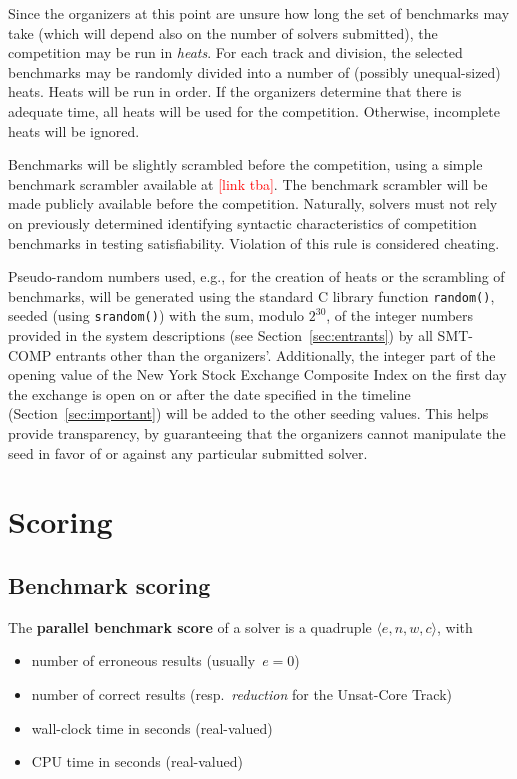 \documentclass[12pt]{article}
\newcommand{\rem}[1]{\textcolor{red}{[#1]}}
\newcommand{\ucoretrack}{Unsat-Core Track\xspace}
\begin{document}
%
Since the organizers at this point are unsure how long the set of
benchmarks may take (which will depend also on the number of solvers
submitted), the competition may be run in \emph{heats}.  For each
track and division, the selected benchmarks may be randomly divided
into a number of (possibly unequal-sized) heats.  Heats will be run in
order.  If the organizers determine that there is adequate time, all
heats will be used for the competition.  Otherwise, incomplete heats
will be ignored.

%
Benchmarks will be slightly scrambled before the competition, using a simple
benchmark scrambler available at \rem{link tba}.  The benchmark scrambler will
be made publicly available before the competition.
%
Naturally, solvers must not rely on previously determined identifying
syntactic characteristics of competition benchmarks in testing
satisfiability.  Violation of this rule is considered cheating.

%
Pseudo-random numbers used, e.g., for the creation of heats or the
scrambling of benchmarks, will be generated using the standard C
library function \texttt{random()}, seeded (using \texttt{srandom()})
with the sum, modulo $2^{30}$, of the integer numbers provided in the
system descriptions (see Section~\ref{sec:entrants}) by all SMT-COMP
entrants other than the organizers'.  Additionally, the integer part
of the opening value of the New York Stock Exchange Composite Index on
the first day the exchange is open on or after the date specified in
the timeline (Section~\ref{sec:important}) will be added to the other
seeding values.  This helps provide transparency, by guaranteeing that
the organizers cannot manipulate the seed in favor of or against any
particular submitted solver.


\section{Scoring}
\label{sec:scoring}

\subsection{Benchmark scoring}
\label{sec:benchmark-scoring}

The \textbf{parallel benchmark score} of a solver is a quadruple $\langle
e, n, w, c\rangle$, with
\begin{itemize}[noitemsep]
  \vspace{-1ex}
  \item {}
    number of erroneous results (usually~$e = 0$)
  \item {}
    number of correct results (resp.~\emph{reduction} for the \ucoretrack)
  \item {}
    wall-clock time in seconds (real-valued)
  \item {}
    CPU time in seconds (real-valued)
\end{itemize}
\end{document}
